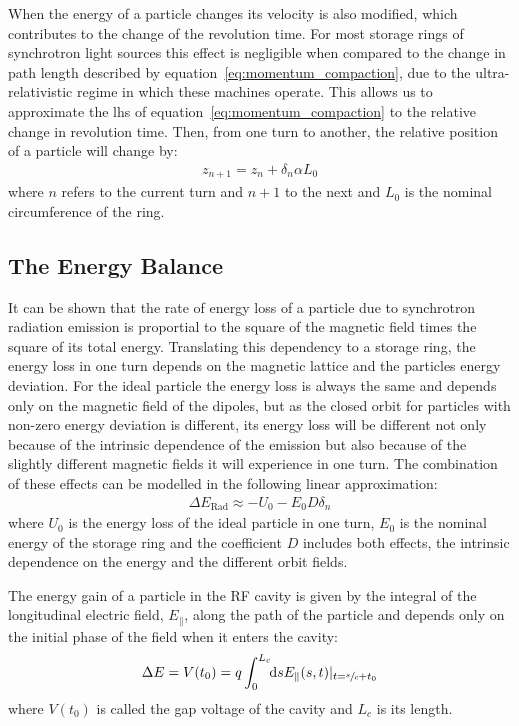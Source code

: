 \documentclass[
	12pt,				%
	openright,			%
	oneside,			%
	a4paper,		%
	chapter=TITLE,		%
	section=TITLE,		%
    brazil,				%
	english,			%
	sumario=tradicional,
	]{abntex2}
\begin{document}
    When the energy of a particle changes its velocity is also modified, which contributes to the change of the revolution time. For most storage rings of synchrotron light sources this effect is negligible when compared to the change in path length described by equation~\eqref{eq:momentum_compaction}, due to the ultra-relativistic regime in which these machines operate. This allows us to approximate the \gls{lhs} of equation~\eqref{eq:momentum_compaction} to the relative change in revolution time. Then, from one turn to another, the relative position of a particle will change by:
	\begin{align}\label{eq:revolution_time_variation}
		z_{n+1} = z_n + \delta_n\alpha L_0
	\end{align}
	where $n$ refers to the current turn and $n+1$ to the next and $L_0$ is the nominal circumference of the ring.

	\subsection{The Energy Balance}

	It can be shown that the rate of energy loss of a particle due to synchrotron radiation emission is proportial to the square of the magnetic field times the square of its total energy. Translating this dependency to a storage ring, the energy loss in one turn depends on the magnetic lattice and the particles energy deviation. For the ideal particle the energy loss is always the same and depends only on the magnetic field of the dipoles, but as the closed orbit for particles with non-zero energy deviation is different, its energy loss will be different not only because of the intrinsic dependence of the emission but also because of the slightly different magnetic fields it will experience in one turn. The combination of these effects can be modelled in the following linear approximation:
	\begin{align}\label{eq:radiation_loss}
		\Delta E_\text{Rad} \approx -U_0 - E_0D\delta_n
	\end{align}
	where $U_0$ is the energy loss of the ideal particle in one turn, $E_0$ is the nominal energy of the storage ring and the coefficient $D$ includes both effects, the intrinsic dependence on the energy and the different orbit fields.

	The energy gain of a particle in the RF cavity is given by the integral of the longitudinal electric field, $E_\parallel$, along the path of the particle and depends only on the initial phase of the field when it enters the cavity:
	\begin{align}
		\Delta E = V(t_0) = q\defint{s}{E_\parallel(s,t)|_{t=\sfrac{s}{c}+t_0}}{0}{L_c}
	\end{align}
	where $V(t_0)$ is called the gap voltage of the cavity and $L_c$ is its length.
\end{document}
